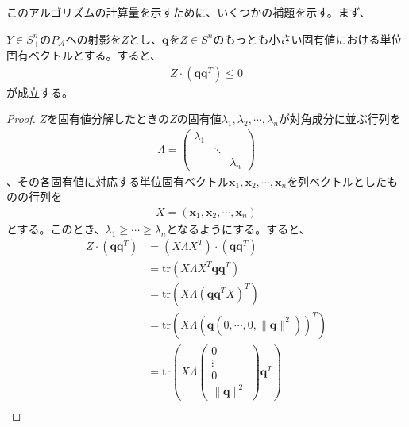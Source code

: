 このアルゴリズムの計算量を示すために、いくつかの補題を示す。まず、
\begin{lemma} \label{NegativeInnerProduct}
  $Y \in S_+^n$の$P_\mathcal{A}$への射影を$Z$とし、$\mathbf{q}$を$Z \in S^n$のもっとも小さい固有値における単位固有ベクトルとする。すると、
  \begin{align*}
    Z \cdot (\mathbf{q} \mathbf{q}^T) \leq 0
  \end{align*}
  が成立する。
\end{lemma}
\begin{proof}
  $Z$を固有値分解したときの$Z$の固有値$\lambda_1, \lambda_2, \cdots, \lambda_n$が対角成分に並ぶ行列を
  \begin{align*}
    \Lambda = \left(
                \begin{array}{ccc}
                  \lambda_1 &        & \\
                            & \ddots & \\
                            &        & \lambda_n
                \end{array}
              \right)
  \end{align*}
  、その各固有値に対応する単位固有ベクトル$\mathbf{x}_1, \mathbf{x}_2, \cdots, \mathbf{x}_n$を列ベクトルとしたものの行列を
  \begin{align*}
    X = \left(\mathbf{x}_1, \mathbf{x}_2, \cdots, \mathbf{x}_n\right)
  \end{align*}
  とする。このとき、$\lambda_1 \geq \cdots \geq \lambda_n$となるようにする。すると、
  \begin{align*}
    Z \cdot (\mathbf{q} \mathbf{q}^T) & = (X \Lambda X^T) \cdot (\mathbf{q} \mathbf{q}^T) \\
                                      & = \mathrm{tr}(X \Lambda X^T \mathbf{q} \mathbf{q}^T) \\
                                      & = \mathrm{tr}\left(X \Lambda \left(\mathbf{q} \mathbf{q}^T X\right)^T\right) \\
                                      & = \mathrm{tr}\left(X \Lambda \left(\mathbf{q} \left(0, \cdots, 0, \|\mathbf{q}\|^2\right)\right)^T\right) \\
                                      & = \mathrm{tr}\left(X \Lambda \left(\begin{array}{c} 0 \\ \vdots \\ 0 \\ \|\mathbf{q}\|^2 \end{array}\right) \mathbf{q}^T\right) \\

\end{align*}
\end{proof}
